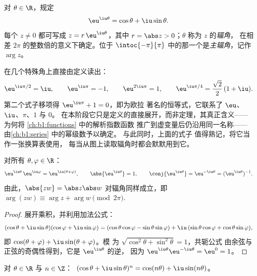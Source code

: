 \begin{definition}[纯虚指数的复指数]\label{def:b1:complex:expi}
对 $\theta \in \R$，规定
\[
\eu^{\iu\theta} = \cos\theta + \iu \sin\theta .
\]
每个 $z \neq 0$ 都可写成 $z = r\,\eu^{\iu\theta}$，其中 $r =
\abs z > 0$；$\theta$ 称为 $z$ 的\emph{辐角}，
在相差 $2\pi$ 的整数倍的意义下确定。位于
$\intoc{-\pi}{\pi}$ 中的那一个是\emph{主辐角}，记作
$\arg z$。
\end{definition}

\begin{example}[若干初值与一个著名恒等式]\label{ex:b1:complex:eulerid}
在几个特殊角上直接由定义读出：
\[
\eu^{\iu\pi/2} = \iu, \qquad
\eu^{\iu\pi} = -1, \qquad
\eu^{2\iu\pi} = 1, \qquad
\eu^{\iu\pi/4} = \frac{\sqrt2}2\,(1 + \iu) .
\]
第二个式子移项得 $\eu^{\iu\pi} + 1 = 0$，即为欧拉
著名的恒等式，它联系了 $\eu$、$\iu$、$\pi$、$1$ 与 $0$。
在本阶段它只是定义的直接展开，而非定理，其真正含义——
为何将 \cref{ch:b1:functions} 中的解析指数函数
推广到虚变量后仍沿用同一名称——由\cref{ch:b1:series}
中的幂级数予以确定。
与此同时，上面的式子
值得熟记，将它当作一张换算表使用，
每当从图上读取辐角时都会默默用到它。
\end{example}

\begin{theorem}[函数方程]\label{thm:b1:complex:funceq}
对所有 $\theta, \varphi \in \R$：
\[
\eu^{\iu\theta}\, \eu^{\iu\varphi} = \eu^{\iu(\theta + \varphi)},
\qquad
\abs{\eu^{\iu\theta}} = 1,
\qquad
\conj{\eu^{\iu\theta}} = \eu^{-\iu\theta} = (\eu^{\iu\theta})^{-1}.
\]
由此，$\abs{zw} = \abs z \abs w$ 对辐角同样成立，即
$\arg(zw) \equiv \arg z + \arg w \pmod{2\pi}$.
\end{theorem}

\begin{proof}
展开乘积，并利用加法公式：
\[
(\cos\theta + \iu\sin\theta)(\cos\varphi + \iu\sin\varphi)
= (\cos\theta\cos\varphi - \sin\theta\sin\varphi)
+ \iu\,(\sin\theta\cos\varphi + \cos\theta\sin\varphi),
\]
即 $\cos(\theta+\varphi) + \iu\sin(\theta+\varphi)$。模
为 $\sqrt{\cos^2\theta + \sin^2\theta} = 1$，共轭公式
由余弦与正弦的奇偶性得到，它是 $\eu^{\iu\theta}$ 的逆，
因为 $\eu^{\iu\theta}\eu^{-\iu\theta} = \eu^0 = 1$。
\end{proof}

\begin{corollary}[棣莫弗公式]\label{cor:b1:complex:demoivre}
对 $\theta \in \R$ 与 $n \in \Z$：
$\;(\cos\theta + \iu\sin\theta)^n = \cos(n\theta) +
\iu\sin(n\theta)$。
\end{corollary}


